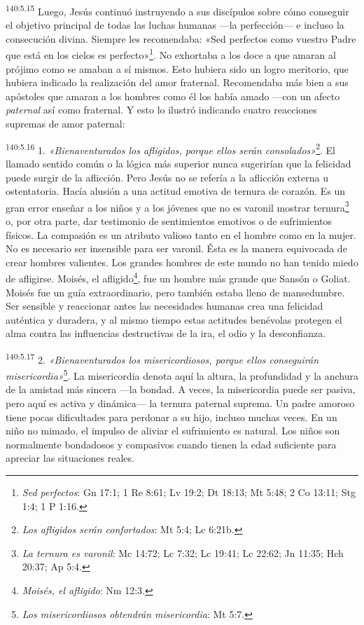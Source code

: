 \par
\textsuperscript{140:5.15} Luego, Jesús continuó instruyendo a sus discípulos sobre cómo conseguir el objetivo principal de todas las luchas humanas ---la perfección--- e incluso la consecución divina. Siempre les recomendaba: «Sed perfectos como vuestro Padre que está en los cielos es perfecto»\footnote{\textit{Sed perfectos}: Gn 17:1; 1 Re 8:61; Lv 19:2; Dt 18:13; Mt 5:48; 2 Co 13:11; Stg 1:4; 1 P 1:16.}. No exhortaba a los doce a que amaran al prójimo como se amaban a sí mismos. Esto hubiera sido un logro meritorio, que hubiera indicado la realización del amor fraternal. Recomendaba más bien a sus apóstoles que amaran a los hombres como él los había amado ---con un afecto \textit{paternal} así como fraternal. Y esto lo ilustró indicando cuatro reacciones supremas de amor paternal:

\par
\textsuperscript{140:5.16} 1. \textit{«Bienaventurados los afligidos, porque ellos serán consolados»}\footnote{\textit{Los afligidos serán confortados}: Mt 5:4; Lc 6:21b.}. El llamado sentido común o la lógica más superior nunca sugerirían que la felicidad puede surgir de la aflicción. Pero Jesús no se refería a la aflicción externa u ostentatoria. Hacía alusión a una actitud emotiva de ternura de corazón. Es un gran error enseñar a los niños y a los jóvenes que no es varonil mostrar ternura\footnote{\textit{La ternura es varonil}: Mc 14:72; Lc 7:32; Lc 19:41; Lc 22:62; Jn 11:35; Hch 20:37; Ap 5:4.} o, por otra parte, dar testimonio de sentimientos emotivos o de sufrimientos físicos. La compasión es un atributo valioso tanto en el hombre como en la mujer. No es necesario ser insensible para ser varonil. Ésta es la manera equivocada de crear hombres valientes. Los grandes hombres de este mundo no han tenido miedo de afligirse. Moisés, el afligido\footnote{\textit{Moisés, el afligido}: Nm 12:3.}, fue un hombre más grande que Sansón o Goliat. Moisés fue un guía extraordinario, pero también estaba lleno de mansedumbre. Ser sensible y reaccionar antes las necesidades humanas crea una felicidad auténtica y duradera, y al mismo tiempo estas actitudes benévolas protegen el alma contra las influencias destructivas de la ira, el odio y la desconfianza.

\par
\textsuperscript{140:5.17} 2. \textit{«Bienaventurados los misericordiosos, porque ellos conseguirán misericordia»}\footnote{\textit{Los misericordiosos obtendrán misericordia}: Mt 5:7.}. La misericordia denota aquí la altura, la profundidad y la anchura de la amistad más sincera ---la bondad. A veces, la misericordia puede ser pasiva, pero aquí es activa y dinámica--- la ternura paternal suprema. Un padre amoroso tiene pocas dificultades para perdonar a su hijo, incluso muchas veces. En un niño no mimado, el impulso de aliviar el sufrimiento es natural. Los niños son normalmente bondadosos y compasivos cuando tienen la edad suficiente para apreciar las situaciones reales.

